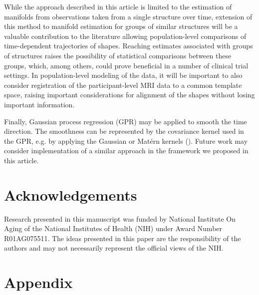 \documentclass[12pt]{article}
\theoremstyle{definition}
\begin{document}
While the approach described in this article is limited to the estimation of manifolds from observations taken from a single structure over time, extension of this method to manifold estimation for groups of similar structures will be a valuable contribution to the literature allowing population-level comparisons of time-dependent trajectories of shapes. Reaching estimates associated with groups of structures raises the possibility of statistical comparisons between these groups, which, among others, could prove beneficial in a number of clinical trial settings. In population-level modeling of the data, it will be important to also consider registration of the participant-level MRI data to a common template space, raising important considerations for alignment of the shapes without losing important information.

Finally, Gaussian process regression (GPR) may be applied to smooth the time direction. The smoothness can be represented by the covariance kernel used in the GPR, e.g. by applying the Gaussian or Matérn kernels (\cite{li2023inference}). Future work may consider implementation of a similar approach in the framework we proposed in this article. 


\section*{Acknowledgements}

Research presented in this manuscript was funded by National Institute On Aging of the National Institutes of Health (NIH) under Award Number R01AG075511. The ideas presented in this paper are the responsibility of the authors and may not necessarily represent the official views of the NIH.




\newpage

%
%

\newpage

\appendix

\section*{Appendix}
\end{document}
